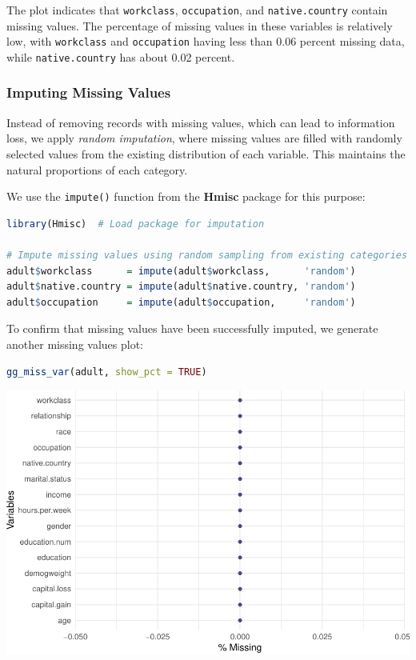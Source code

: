 \documentclass[
]{book}
\newcommand{\passthrough}[1]{#1}
\theoremstyle{definition}
\theoremstyle{definition}
\theoremstyle{definition}
\theoremstyle{definition}
\theoremstyle{remark}
\begin{document}
The plot indicates that \passthrough{\lstinline!workclass!}, \passthrough{\lstinline!occupation!}, and \passthrough{\lstinline!native.country!} contain missing values. The percentage of missing values in these variables is relatively low, with \passthrough{\lstinline!workclass!} and \passthrough{\lstinline!occupation!} having less than 0.06 percent missing data, while \passthrough{\lstinline!native.country!} has about 0.02 percent.

\subsubsection*{Imputing Missing Values}\label{imputing-missing-values}

Instead of removing records with missing values, which can lead to information loss, we apply \emph{random imputation}, where missing values are filled with randomly selected values from the existing distribution of each variable. This maintains the natural proportions of each category.

We use the \passthrough{\lstinline!impute()!} function from the \textbf{Hmisc} package for this purpose:

\begin{lstlisting}[language=R]
library(Hmisc)  # Load package for imputation

# Impute missing values using random sampling from existing categories
adult$workclass      = impute(adult$workclass,      'random')
adult$native.country = impute(adult$native.country, 'random')
adult$occupation     = impute(adult$occupation,     'random')
\end{lstlisting}

To confirm that missing values have been successfully imputed, we generate another missing values plot:

\begin{lstlisting}[language=R]
gg_miss_var(adult, show_pct = TRUE)
\end{lstlisting}

\begin{center}\includegraphics[width=0.7\linewidth]{data-preparation_files/figure-latex/unnamed-chunk-20-1} \end{center}
\end{document}
